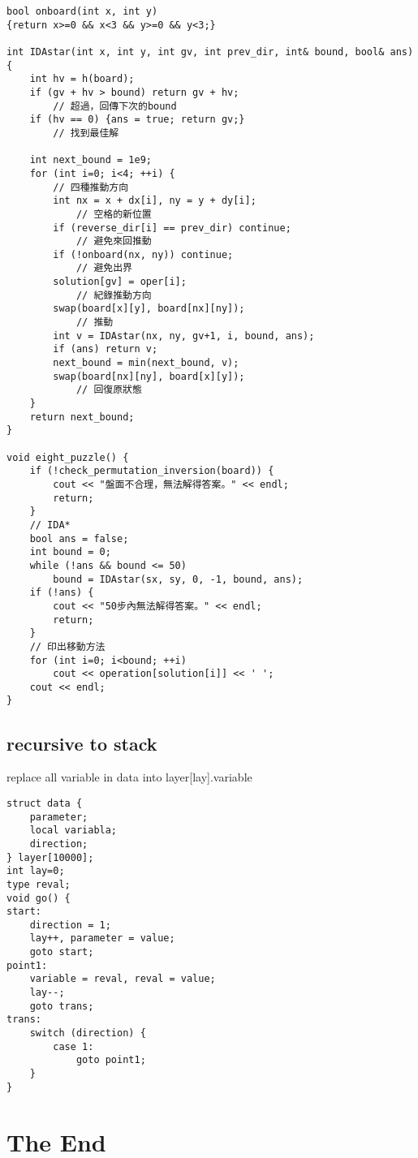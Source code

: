 \documentclass[11pt,twocolumn,a4paper]{article}
\begin{document}
\begin{lstlisting}[label=8 puzzle - IDA*]
bool onboard(int x, int y)
{return x>=0 && x<3 && y>=0 && y<3;}
 
int IDAstar(int x, int y, int gv, int prev_dir, int& bound, bool& ans) {
	int hv = h(board);
	if (gv + hv > bound) return gv + hv;
		// 超過，回傳下次的bound
	if (hv == 0) {ans = true; return gv;}
		// 找到最佳解
 
	int next_bound = 1e9;
	for (int i=0; i<4; ++i) {
		// 四種推動方向
		int nx = x + dx[i], ny = y + dy[i];
			// 空格的新位置
		if (reverse_dir[i] == prev_dir) continue;
			// 避免來回推動
		if (!onboard(nx, ny)) continue;
			// 避免出界
		solution[gv] = oper[i];
			// 紀錄推動方向
		swap(board[x][y], board[nx][ny]);
			// 推動
		int v = IDAstar(nx, ny, gv+1, i, bound, ans);
		if (ans) return v;
		next_bound = min(next_bound, v);
		swap(board[nx][ny], board[x][y]);
			// 回復原狀態
	}
	return next_bound;
}
 
void eight_puzzle() {
	if (!check_permutation_inversion(board)) {
		cout << "盤面不合理，無法解得答案。" << endl;
		return;
	}
	// IDA*
	bool ans = false;
	int bound = 0;
	while (!ans && bound <= 50)
		bound = IDAstar(sx, sy, 0, -1, bound, ans);
	if (!ans) {
		cout << "50步內無法解得答案。" << endl;
		return;
	}
	// 印出移動方法
	for (int i=0; i<bound; ++i)
		cout << operation[solution[i]] << ' ';
	cout << endl;
}
\end{lstlisting}
\subsection{recursive to stack}
replace all variable in data into layer[lay].variable
\begin{lstlisting}[label=recursive to stack]
struct data {
	parameter;
	local variabla;
	direction;
} layer[10000];
int lay=0;
type reval;
void go() {
start:
	direction = 1;
	lay++, parameter = value;
	goto start;
point1:
	variable = reval, reval = value;
	lay--;
	goto trans;
trans:
	switch (direction) {
		case 1:
			goto point1;
	}
}
\end{lstlisting}
\section*{The End}
\end{document}
